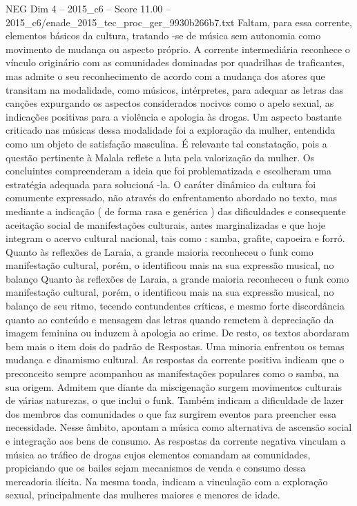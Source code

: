 \begin{textsample}{NEG Dim 4 – 2015\_c6 – Score 11.00 – 2015\_c6/enade\_2015\_tec\_proc\_ger\_9930b266b7.txt}
Faltam, para essa corrente, elementos básicos da cultura, tratando -se de música sem autonomia como movimento de mudança ou aspecto próprio.
A corrente intermediária reconhece o vínculo originário com as comunidades dominadas por quadrilhas de traficantes, mas admite o seu reconhecimento de acordo com a mudança dos atores que transitam na modalidade, como músicos, intérpretes, para adequar as letras das canções expurgando os aspectos considerados nocivos como o apelo sexual, as indicações positivas para a violência e apologia às drogas.
Um aspecto bastante criticado nas músicas dessa modalidade foi a exploração da mulher, entendida como um objeto de satisfação masculina.
É relevante tal constatação, pois a questão pertinente à Malala reflete a luta pela valorização da mulher.
Os concluintes compreenderam a ideia que foi problematizada e escolheram uma estratégia adequada para solucioná -la.
O caráter dinâmico da cultura foi comumente expressado, não através do enfrentamento abordado no texto, mas mediante a indicação ( de forma rasa e genérica ) das dificuldades e consequente aceitação social de manifestações culturais, antes marginalizadas e que hoje integram o acervo cultural nacional, tais como : samba, grafite, capoeira e forró.
Quanto às reflexões de Laraia, a grande maioria reconheceu o funk como manifestação cultural, porém, o identificou mais na sua expressão musical, no balanço Quanto às reflexões de Laraia, a grande maioria reconheceu o funk como manifestação cultural, porém, o identificou mais na sua expressão musical, no balanço de seu ritmo, tecendo contundentes críticas, e mesmo forte discordância quanto ao conteúdo e mensagem das letras quando remetem à depreciação da imagem feminina ou induzem à apologia ao crime.
De resto, os textos abordaram bem mais o item dois do padrão de Respostas.
Uma minoria enfrentou os temas mudança e dinamismo cultural.
As respostas da corrente positiva indicam que o preconceito sempre acompanhou as manifestações populares como o samba, na sua origem.
Admitem que diante da miscigenação surgem movimentos culturais de várias naturezas, o que inclui o funk.
Também indicam a dificuldade de lazer dos membros das comunidades o que faz surgirem eventos para preencher essa necessidade.
Nesse âmbito, apontam a música como alternativa de ascensão social e integração aos bens de consumo.
As respostas da corrente negativa vinculam a música ao tráfico de drogas cujos elementos comandam as comunidades, propiciando que os bailes sejam mecanismos de venda e consumo dessa mercadoria ilícita.
Na mesma toada, indicam a vinculação com a exploração sexual, principalmente das mulheres maiores e menores de idade.

\end{textsample}
